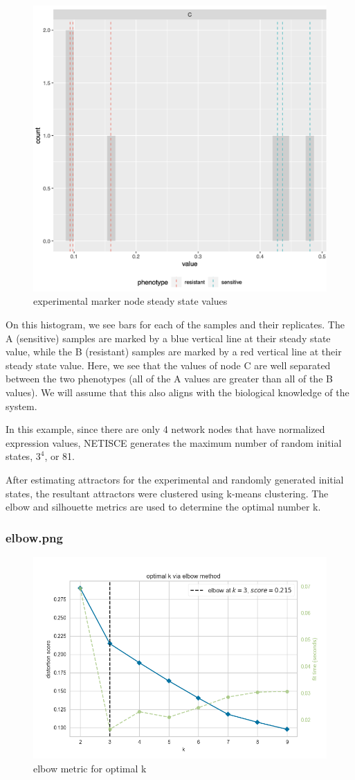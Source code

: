 \documentclass[
]{book}
\begin{document}
\begin{figure}

{\centering \includegraphics[width=0.5\linewidth]{images/expmarkers} 

}

\caption{experimental marker node steady state values}\label{fig:unnamed-chunk-10}
\end{figure}

On this histogram, we see bars for each of the samples and their replicates. The A (sensitive) samples are marked by a blue vertical line at their steady state value, while the B (resistant) samples are marked by a red vertical line at their steady state value. Here, we see that the values of node C are well separated between the two phenotypes (all of the A values are greater than all of the B values). We will assume that this also aligns with the biological knowledge of the system.

In this example, since there are only 4 network nodes that have normalized expression values, NETISCE generates the maximum number of random initial states, \(3^4\), or 81.

After estimating attractors for the experimental and randomly generated initial states, the resultant attractors were clustered using k-means clustering. The elbow and silhouette metrics are used to determine the optimal number k.

\hypertarget{section-id}{%
\subsubsection*{elbow.png}\label{section-id}}

\begin{figure}

{\centering \includegraphics[width=0.5\linewidth]{results/elbow} 

}

\caption{elbow metric for optimal k}\label{fig:unnamed-chunk-11}
\end{figure}
\end{document}

